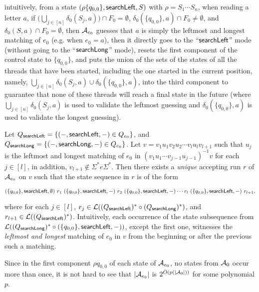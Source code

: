 \begin{itemize}
\begin{itemize}
		\medskip
		intuitively, from a state $(\rho \{q_{0,0}\}, \mathsf{searchLeft}, S)$ with $\rho = S_1 \cdots S_n$, when reading a letter $a$, if $\big(\bigcup \limits_{j \in [n]} \delta_0(S_j, a) \big) \cap F_0 = \emptyset$, $\delta_0(\{q_{0,0}\}, a) \cap F_0 \neq \emptyset$, and $\delta_0(S,a) \cap F_0 = \emptyset$, then $\mathcal{A}_{e_0}$  guesses that $a$ is simply the leftmost and longest matching of $e_0$ (e.g. when $e_0= a$), then it directly goes to the ``$\mathsf{searchLeft}$'' mode (without going to the ``$\mathsf{searchLong}$'' mode), resets the first component of the control state to $\{q_{0,0}\}$, and puts the union of the sets of the states of all the threads that have been started, including the one started in the current position, namely, $\bigcup \limits_{j \in [n]} \delta_0(S_j, a) \cup \delta_0(\{q_{0,0}\}, a)$, into the third component to  guarantee that none of these threads will reach a final state in the future (where $\bigcup \limits_{j \in [n]} \delta_0(S_j, a)$ is used to validate the leftmost guessing and $\delta_0(\{q_{0,0}\}, a)$ is used to validate the longest guessing).
	\end{itemize}
\end{itemize}

Let $Q_{\mathsf{searchLeft}}  = \{ (-, \mathsf{searchLeft}, -) \in Q_{e_0} \}$,  and $Q_{\mathsf{searchLong}} = \{ (-, \mathsf{searchLong}, -)  \in Q_{e_0}\}$.
Let $v = v_1 u_1 v_2 u_2 \cdots v_l u_l v_{l+1}$ such that $u_j$ is the leftmost and longest matching of $e_0$ in $(v_1 u_1 \cdots v_{j-1} u_{j-1})^{-1} v$ for each $j \in [l]$, in addition, $v_{l+1} \not \in \Sigma^\ast e \Sigma^\ast$. Then there exists a \emph{unique} accepting run $r$ of $\mathcal{A}_{e_0}$ on $v$ such that the state sequence in $r$ is of the form 

\medskip
{\small
$
(\{q_{0,0}\}, \mathsf{searchLeft}, \emptyset)\ r_1\ ( \{q_{0,0}\}, \mathsf{searchLeft}, -) \ r_2\ ( \{q_{0,0}\}, \mathsf{searchLeft}, -)
\cdots r_l\ ( \{q_{0,0}\}, \mathsf{searchLeft}, -)\ r_{l+1},
$
}
\medskip

where for each $j \in [l]$, $r_j \in \mathcal{L}((Q_{\mathsf{searchLeft}})^* \circ (Q_{\mathsf{searchLong}})^*)$, and $r_{l+1} \in \mathcal{L}((Q_{\mathsf{searchLeft}})^*)$. Intuitively, each occurrence of the state subsequence from $\mathcal{L}((Q_{\mathsf{searchLong}})^* \circ (\{q_{0,0}\}, \mathsf{searchLeft},-))$, except the first one, witnesses the \emph{leftmost and longest} matching of $e_0$ in $v$ from the beginning or after the previous such a matching.

Since in the first component $\rho q_{0,0}$ of each state of $\mathcal{A}_{e_0}$, no states from $\mathcal{A}_0$ occur more than once,  it is not hard to see that $|\mathcal{A}_{e_0}|$ is $2^{O(p(|\mathcal{A}_0|))}$ for some polynomial $p$. 

